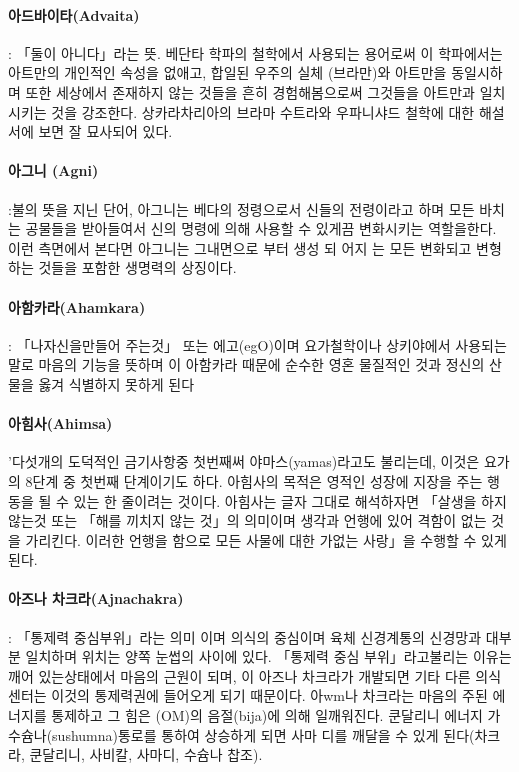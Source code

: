 \documentclass[12pt, a4paper, oneside]{book}
\begin{document}
\paragraph{아드바이타(Advaita)} : 「둘이 아니다」라는 뜻. 베단타 학파의 철학에서 사용되는 용어로써 이 학파에서는 아트만의 개인적인 속성을 없애고, 합일된 우주의 실체 (브라만)와 아트만을 동일시하며 또한 세상에서 존재하지 않는 것들을 흔히 경험해봄으로써 그것들을 아트만과 일치시키는 것을 강조한다. 상카라차리아의 브라마 수트라와 우파니샤드 철학에 대한 해설서에 보면 잘 묘사되어 있다.

\paragraph{아그니 (Agni)} :불의 뜻을 지닌 단어, 아그니는 베다의 정령으로서 신들의 전령이라고 하며 모든 바치는 공물들을 받아들여서 신의 명령에 의해 사용할 수 있게끔 변화시키는 역할을한다. 이런 측면에서 본다면 아그니는 그내면으로 부터 생성 되 어지 는 모든 변화되고 변형 하는 것들을 포함한 생명력의 상징이다.

\paragraph{아함카라(Ahamkara)} : 「나자신을만들어 주는것」 또는 에고(egO)이며 요가철학이나 상키야에서 사용되는 말로 마음의 기능을 뜻하며 이 아함카라 때문에 순수한 영혼 물질적인 것과 정신의 산물을 옳겨 식별하지 못하게 된다

\paragraph{아힘사(Ahimsa)} '다섯개의 도덕적인 금기사항중 첫번째써 야마스(yamas)라고도 불리는데, 이것은 요가의 8단계 중 첫번째 단계이기도 하다. 아힘사의 목적은 영적인 성장에 지장을 주는 행동을 될 수 있는 한 줄이려는 것이다. 아힘사는 글자 그대로 해석하자면 「살생을 하지않는것 또는 「해를 끼치지 않는 것」의 의미이며 생각과 언행에 있어 격함이 없는 것을 가리킨다. 이러한 언행을 함으로 모든 사물에 대한 가없는 사랑」을 수행할 수 있게 된다.

\paragraph{아즈나 차크라(Ajnachakra)} : 「통제력 중심부위」라는 의미 이며 의식의 중심이며 육체 신경계통의 신경망과 대부분 일치하며 위치는 양쪽 눈썹의 사이에 있다. 「통제력 중심 부위」라고불리는 이유는깨어 있는상태에서 마음의 근원이 되며, 이 아즈나 차크라가 개발되면 기타 다른 의식  센터는 이것의 통제력권에 들어오게 되기 때문이다. 아wm나 차크라는 마음의 주된 에너지를 통제하고 그 힘은 (OM)의 음절(bija)에 의해 일깨워진다. 쿤달리니 에너지 가 수슘나(sushumna)통로를 통하여 상승하게 되면 사마 디를 깨달을 수 있게 된다(차크라, 쿤달리니, 사비칼, 사마디, 수슘나 찹조).
\end{document}
